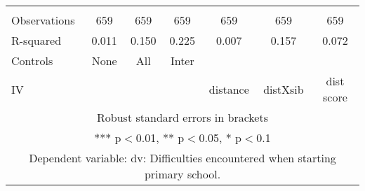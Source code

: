\begin{tabular}{lcccccc}
 &  &  &  &  &  &  \\
Observations & 659 & 659 & 659 & 659 & 659 & 659 \\
R-squared & 0.011 & 0.150 & 0.225 & 0.007 & 0.157 & 0.072 \\
Controls & None & All & Inter &  &  &  \\
 IV &  &  &  & distance & distXsib & dist score \\ \hline
\multicolumn{7}{c}{ Robust standard errors in brackets} \\
\multicolumn{7}{c}{ *** p$<$0.01, ** p$<$0.05, * p$<$0.1} \\
\multicolumn{7}{c}{ Dependent variable: dv: Difficulties encountered when starting primary school.} \\
\end{tabular}
